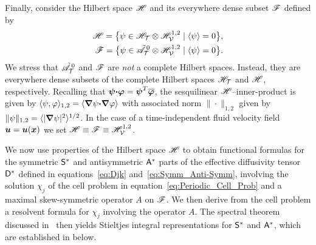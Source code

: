 \documentclass[amsa]{ipart}
\begin{document}
Finally, consider the Hilbert
space $\mathscr{H}$ and its everywhere dense subset $\mathscr{F}$ defined by
%
\begin{align}\label{eq:Function_Space_Scalar}
  \Hs=\big\{\psi\in\Hs_{\Tc}\otimes\Hs^{1,2}_{\Vc} \; | \; \langle \psi\rangle=0\big\}, \\
  \Fs=\big\{\psi\in\tilde{\As}^{\,0}_{\Tc}\otimes\Hs^{1,2}_{\Vc} \; | \; \langle \psi\rangle=0\big\}.
  \notag
\end{align}
%
We stress that $\tilde{\mathscr{A}}^{\,0}_{\mathcal{T}}$ and $\mathscr{F}$ are \emph{not} a
complete Hilbert spaces. Instead, they are everywhere dense subsets of
the complete Hilbert spaces $\mathscr{H}_{\mathcal{T}}$ and $\mathscr{H}$, respectively.
Recalling that $\boldsymbol{\psi}\mbox{\boldmath${\cdot}$}\boldsymbol{\varphi}=\boldsymbol{\psi}^T\overline{\boldsymbol{\varphi}}$,
the sesquilinear  
$\mathscr{H}$--inner-product is given by $\langle\psi,\varphi\rangle_{1,2}=\left\langle\mbox{\boldmath${\nabla}$} \psi\mbox{\boldmath${\cdot}$}\mbox{\boldmath${\nabla}$} \varphi \right\rangle$ with associated norm
$\|\cdot\|_{1,2}$ given by $\|\psi\|_{1,2}= \langle|\mbox{\boldmath${\nabla}$} \psi|^2\rangle^{1/2}$.
In the case of a 
time-independent fluid velocity field $\boldsymbol{u}=\boldsymbol{u}(\boldsymbol{x})$ we set 
$\mathscr{H}\equiv\mathscr{F}\equiv\mathscr{H}^{1,2}_{\mathcal{V}}$.  





We now use properties of the Hilbert space $\mathscr{H}$ to obtain
functional formulas for the symmetric $\mathsf{S}^*$ and antisymmetric
$\mathsf{A}^*$ parts of the effective diffusivity tensor $\mathsf{D}^*$ defined in
equations~\eqref{eq:Djk} and~\eqref{eq:Symm_Anti-Symm}, involving the
solution $\chi_j$ of the cell problem in
equation~\eqref{eq:Periodic_Cell_Prob} and a maximal skew-symmetric
operator $A$ on $\mathscr{F}$. We then derive from the cell 
problem a resolvent formula for $\chi_j$ involving the operator
$A$. The spectral theorem discussed in~
then yields Stieltjes integral representations for
$\mathsf{S}^*$ and $\mathsf{A}^*$, which are established in
 below. 
\end{document}
